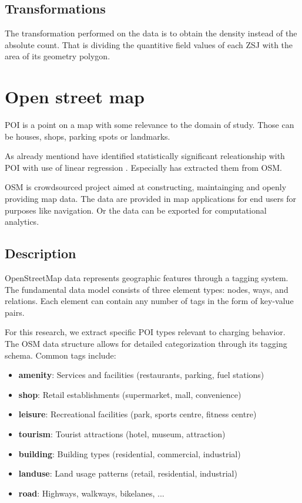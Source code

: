 \subsection{Transformations}

The transformation performed on the data is to obtain the density instead of the absolute count. That is dividing the quantitive field values of each ZSJ with the area of its geometry polygon.

\section{Open street map}

\acrfull{POI} is a point on a map with some relevance to the domain of study. Those can be houses, shops, parking spots or landmarks.

As already mentiond  have identified statistically significant releationship with \acrshort{POI} with use of linear regression . Especially \cite{hechtGlobalElectricVehicle2024} has extracted them from \acrfull{OSM}.

\acrlong{OSM} is crowdsourced project aimed at constructing, maintainging and openly providing map data. The data are provided in map applications for end users for purposes like navigation. Or the data can be exported for computational analytics.

\subsection{Description}

OpenStreetMap data represents geographic features through a tagging system. The fundamental data model consists of three element types: nodes, ways, and relations. Each element can contain any number of tags in the form of key-value pairs.

For this research, we extract specific POI types relevant to charging behavior. The OSM data structure allows for detailed categorization through its tagging schema. Common tags include:

\begin{itemize}
    \item \textbf{amenity}: Services and facilities (restaurants, parking, fuel stations)
    \item \textbf{shop}: Retail establishments (supermarket, mall, convenience)
    \item \textbf{leisure}: Recreational facilities (park, sports centre, fitness centre)
    \item \textbf{tourism}: Tourist attractions (hotel, museum, attraction)
    \item \textbf{building}: Building types (residential, commercial, industrial)
    \item \textbf{landuse}: Land usage patterns (retail, residential, industrial)
    \item \textbf{road}: Highways, walkways, bikelanes, ...
\end{itemize}

